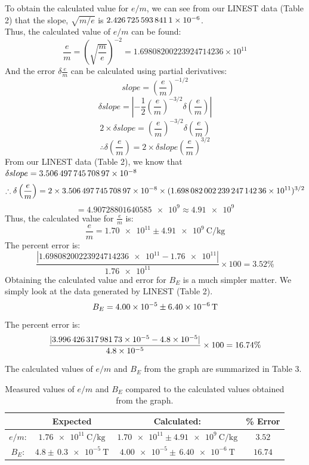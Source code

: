 \documentclass[letterpaper]{article}
\begin{document}
\noindent To obtain the calculated value for $e/m$, we can see from our LINEST data (Table 2) that the slope, $\sqrt{m/e}$ is
$\num{2.4267255938411E-06}$.\\
Thus, the calculated value of $e/m$ can be found:
$$ \frac{e}{m} = \left(\sqrt{\frac{m}{e}}\right)^{-2} = 1.69808200223924714236 \times 10^{11} $$
And the error $\delta \frac{e}{m}$ can be calculated using partial derivatives:
$$slope= \left(\frac{e}{m}\right)^{-1/2}$$
$$\delta slope = \left| -\frac{1}{2} \left(\frac{e}{m}\right)^{-3/2} \delta \left(\frac{e}{m}\right)\right|$$
$$ 2 \times \delta slope = \left(\frac{e}{m}\right)^{-3/2} \delta \left(\frac{e}{m}\right) $$
$$ \therefore \delta \left(\frac{e}{m}\right) = 2 \times \delta slope \left(\frac{e}{m}\right)^{3/2}$$
From our LINEST data (Table 2), we know that $\delta slope = \num{3.50649774570897E-08} $
$$ \therefore \delta \left(\frac{e}{m}\right) = 2 \times \num{3.50649774570897E-08} \times (\num{1.69808200223924714236e11})^{3/2}$$
$$= \num{4.90728801640585e9} \approx \num{4.91e9}$$
Thus, the calculated value for $\frac{e}{m}$ is:
$$\frac{e}{m}=\num{1.70e11} \pm \SI{4.91e9}{\coulomb\per\kilogram}$$
The percent error is:
$$ \frac{|\num{1.69808200223924714236e11}-\num{1.76e11}|}{\num{1.76e11}}\times100 = 3.52\%$$
Obtaining the calculated value and error for $B_E$ is a much simpler matter. We simply
look at the data generated by LINEST (Table 2).
$$B_E = \num{4.00E-05}\pm \SI{6.40E-06}{\tesla}$$
The percent error is:
$$ \frac{|\num{3.99642631798173E-05}-\num{4.8e-5}|}{\num{4.8e-5}}\times100 = 16.74\%$$

\vspace{1cm}
\noindent The calculated values of $e/m$ and $B_E$ from the graph are summarized in Table 3.
\begin{table}[H]
\centering
\begin{tabular}{c|c|c|c|}
                & Expected                      & Calculated:                                     & \% Error \\ \hline
$e/m$: & $\SI{1.76e11}{\coulomb\per\kilogram}$      & $\num{1.70e11} \pm \SI{4.91e9}{\coulomb\per\kilogram}$  &    $3.52$  \\ \hline
$B_E$: & $4.8 \pm \,\SI{0.3e-5}{\tesla}$           & $\num{4.00e-5} \pm \,\SI{6.40e-6}{\tesla}$                    &   $16.74$  \\ \hline
\end{tabular}
\caption{Measured values of $e/m$ and $B_E$ compared to the calculated values obtained from the graph.}
\end{table}
\end{document}
